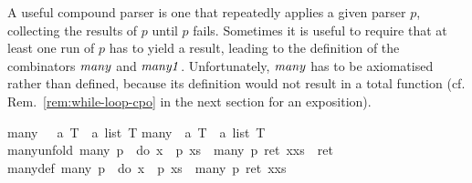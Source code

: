 A useful compound parser is one that repeatedly applies a given parser $p$,
collecting the results of $p$ until $p$ fails. Sometimes it is useful to require
that at least one run of $p$ has to yield a result, leading to the definition
of the combinators $\mathit{many}$ and $\mathit{many1}$. Unfortunately, $\mathit{many}$ has
to be axiomatised rather than defined, because its definition would not result
in a total function (cf. Rem.~\ref{rem:while-loop-cpo} in the next section for an
exposition). 
\begin{isabellebody}
\isanewline
{}\isanewline
many\ \ {\isacharcolon}{\isacharcolon}\ {\isachardoublequote}{\isacharprime}a\ T\ {\isasymRightarrow}\ {\isacharprime}a\ list\ T{\isachardoublequote}\isanewline
many{}\ {\isacharcolon}{\isacharcolon}\
{\isachardoublequote}{\isacharprime}a\ T\ {\isasymRightarrow}\ {\isacharprime}a\
list\ T{\isachardoublequote}\isanewline
\isacommand{axioms}\isanewline
many{\isacharunderscore}unfold{\isacharcolon}\ {\isachardoublequote}many\ p\ {\isacharequal}\ {\isacharparenleft}{\isacharparenleft}do\ {\isacharbraceleft}x\ {\isasymleftarrow}\ p{\isacharsemicolon}\ xs\ {\isasymleftarrow}\ many\ p{\isacharsemicolon}\ ret\ {\isacharparenleft}x{\isacharhash}xs{\isacharparenright}{\isacharbraceright}{\isacharparenright}\ {\isasymparallel}\ ret\ {\isacharbrackleft}{\isacharbrackright}{\isacharparenright}{\isachardoublequote}\isanewline
\isacommand{defs}\isanewline
many{\isadigit{1}}{\isacharunderscore}def{\isacharcolon}\ {\isachardoublequote}many{\isadigit{1}}\ p\ {\isasymequiv}\ {\isacharparenleft}do\ {\isacharbraceleft}x\ {\isasymleftarrow}\ p{\isacharsemicolon}\ xs\ {\isasymleftarrow}\ many\ p{\isacharsemicolon}\ ret\ {\isacharparenleft}x{\isacharhash}xs{\isacharparenright}{\isacharbraceright}{\isacharparenright}{\isachardoublequote}\isanewline
\isamarkupfalse%
\end{isabellebody}

